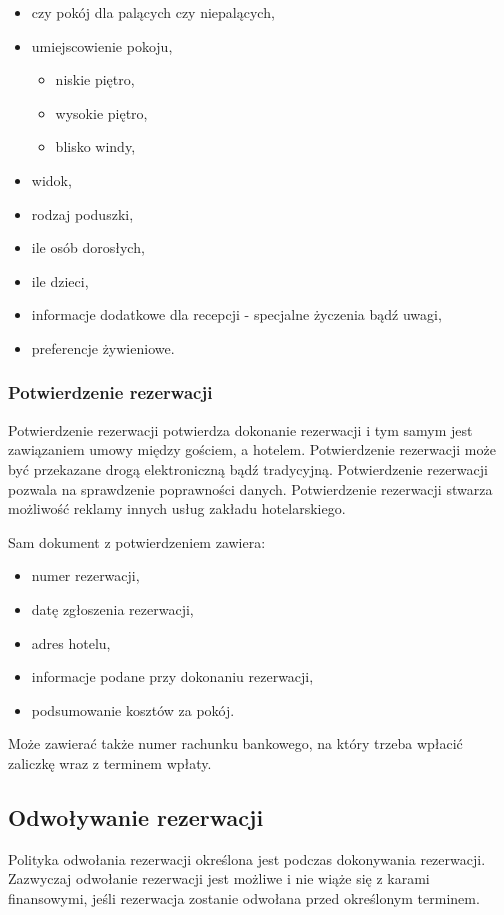 \documentclass[a4paper,onecolumn,oneside,11pt,wide,floatssmall]{mwrep}
\theoremstyle{definition}
\theoremstyle{plain}%
\theoremstyle{remark}
\begin{document}
\begin{itemize}
  \item czy pokój dla palących czy niepalących,
  \item umiejscowienie pokoju,
  \begin{itemize}
    \item niskie piętro,
    \item wysokie piętro,
    \item blisko windy,
  \end{itemize}
  \item widok,
  \item rodzaj poduszki,
  \item ile osób dorosłych,
  \item ile dzieci,
  \item informacje dodatkowe dla recepcji - specjalne życzenia bądź uwagi,
  \item preferencje żywieniowe.
\end{itemize}


\subsubsection{Potwierdzenie rezerwacji}
Potwierdzenie rezerwacji potwierdza dokonanie rezerwacji i tym samym jest 
zawiązaniem umowy między gościem, a hotelem. Potwierdzenie rezerwacji może 
być przekazane drogą elektroniczną bądź tradycyjną. Potwierdzenie rezerwacji 
pozwala na sprawdzenie poprawności danych. Potwierdzenie rezerwacji stwarza 
możliwość reklamy innych usług zakładu hotelarskiego. 

Sam dokument z potwierdzeniem zawiera:
\begin{itemize}
  \item numer rezerwacji,
  \item datę zgłoszenia rezerwacji,
  \item adres hotelu,
  \item informacje podane przy dokonaniu rezerwacji,
  \item podsumowanie kosztów za pokój.
\end{itemize}

Może zawierać także numer rachunku bankowego, na który trzeba wpłacić 
zaliczkę wraz z terminem wpłaty.

\subsection{Odwoływanie rezerwacji}
Polityka odwołania rezerwacji określona jest podczas dokonywania 
rezerwacji. Zazwyczaj odwołanie rezerwacji jest możliwe i nie wiąże się z karami finansowymi, 
jeśli rezerwacja zostanie odwołana przed określonym terminem. 
\end{document}
